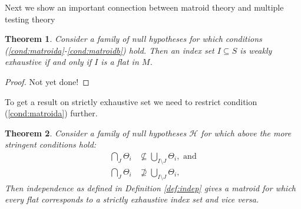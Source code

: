 \documentclass[a4paper,12pt]{article}
\newtheorem{theorem}{Theorem}
\newtheorem{comment}{Comment}
\begin{document}
\begin{comment}
    testing perspective we may simple drop $H_1$ as it is simply $H_2
    \cap H_3$ which would be tested anyways.
  \item Now consider for $\delta > 0$,
    \begin{align*}
      H_1:& (\mu_1 \leq 0) &, (\mu_2 \leq 0) \\
      H_2:& \mu_1 &\leq \delta \\
      H_3:& \mu_2 &\leq \delta.
    \end{align*}
    Again, Condition \ref{cond:matroida} does not hold. However, in
    this case replacing the system by an equivalent system of null
    hypotheses is not as straight forward. A solution may be to
    replace $H_1$ by:
    \begin{align*}
      H_{1a}:& \mu_1 &\leq 0 \\
      H_{1b}:& \mu_2 &\leq 0,
    \end{align*}
  \end{itemize}
\end{comment}

Next we show an important connection between matroid theory and
multiple testing theory

\begin{theorem}
  \label{the:strictly.exhaustive}
  Consider a family of null hypotheses for which conditions
  (\ref{cond:matroida}-\ref{cond:matroidb}) hold. Then an index set $I \subseteq S$ is
  weakly exhaustive if and only if $I$ is a flat in $M$.
\end{theorem}

\begin{proof}
  Not yet done!
\end{proof}

To get a result on strictly exhaustive set we need to restrict
condition (\ref{cond:matroida}) further.

\begin{theorem}
  Consider a family of null hypotheses $\mathcal{H}$ for which above
  the more stringent conditions hold:
  \begin{align}
    \label{cond:matroid2}
    \bigcap_J \Theta_i &\nsubseteq \bigcup_{I\setminus J} \Theta_i,
    \text{ and} \\
    \bigcap_{J}\Theta_i &\nsupseteq     \bigcup_{I \setminus J} \Theta_i ,
  \end{align}
  Then independence as defined in Definition \ref{def:indep} gives a
  matroid for   which every flat corresponds to a strictly exhaustive
  index set and vice versa.
\end{theorem}
\end{document}
